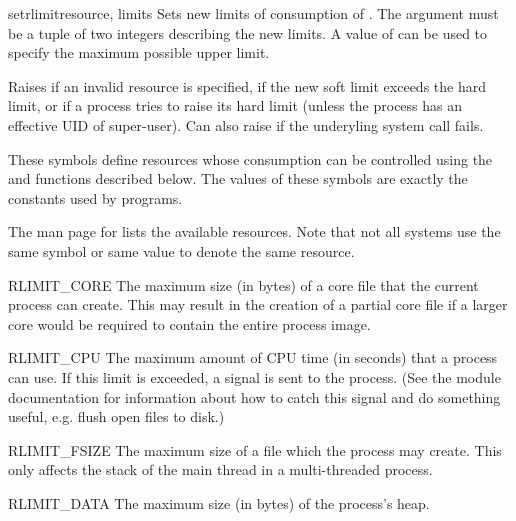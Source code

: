\begin{funcdesc}{setrlimit}{resource, limits}
  Sets new limits of consumption of . The 
  argument must be a tuple  of two
  integers describing the new limits. A value of  can be used to
  specify the maximum possible upper limit.

  Raises  if an invalid resource is specified,
  if the new soft limit exceeds the hard limit, or if a process tries
  to raise its hard limit (unless the process has an effective UID of
  super-user).  Can also raise  if the underyling
  system call fails.
\end{funcdesc}

These symbols define resources whose consumption can be controlled
using the  and  functions
described below. The values of these symbols are exactly the constants
used by \C{} programs.

The \UNIX{} man page for  lists the available
resources.  Note that not all systems use the same symbol or same
value to denote the same resource.

\begin{datadesc}{RLIMIT_CORE}
  The maximum size (in bytes) of a core file that the current process
  can create.  This may result in the creation of a partial core file
  if a larger core would be required to contain the entire process
  image.
\end{datadesc}

\begin{datadesc}{RLIMIT_CPU}
  The maximum amount of CPU time (in seconds) that a process can
  use. If this limit is exceeded, a  signal is sent to
  the process. (See the  module documentation for
  information about how to catch this signal and do something useful,
  e.g. flush open files to disk.)
\end{datadesc}

\begin{datadesc}{RLIMIT_FSIZE}
  The maximum size of a file which the process may create.  This only
  affects the stack of the main thread in a multi-threaded process.
\end{datadesc}

\begin{datadesc}{RLIMIT_DATA}
  The maximum size (in bytes) of the process's heap.
\end{datadesc}

